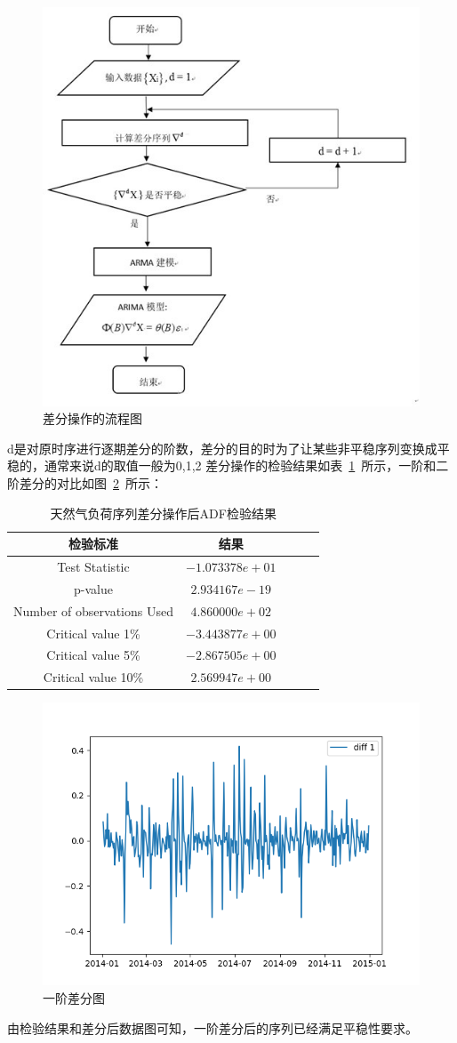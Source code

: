 \documentclass{whutmod}
\begin{document}
	\begin{figure}[H]
		\centering
		\includegraphics[width=.55\textwidth]{figures/4.jpg}
		\caption{差分操作的流程图}\label{img004}
	\end{figure}
	d是对原时序进行逐期差分的阶数，差分的目的时为了让某些非平稳序列变换成平稳的，通常来说d的取值一般为0,1,2
	差分操作的检验结果如表~\ref{tab003}~所示，一阶和二阶差分的对比如图~\ref{img006}~所示：
	\begin{table}[H]
		\caption{天然气负荷序列差分操作后ADF检验结果}\label{tab003} \centering
		\begin{tabular}{ccccc}
			\toprule[1.5pt]
			检验标准 & 结果\\
			\midrule[1pt]
			Test Statistic & $-1.073378e+01$ \\ 
			p-value & $2.934167e-19$ \\
			Number of observations Used & $4.860000e+02$ \\
			Critical value 1\% & $-3.443877e+00$ \\
			Critical value 5\% & $-2.867505e+00$ \\
			Critical value 10\% & $2.569947e+00$ \\
			\bottomrule[1.5pt]
		\end{tabular}
	\end{table}
	\begin{figure}[H]
		\centering
		\includegraphics[width=.6\textwidth]{figures/6.png}
		\caption{一阶差分图}\label{img006}
	\end{figure}
	由检验结果和差分后数据图可知，一阶差分后的序列已经满足平稳性要求。
\end{document}
